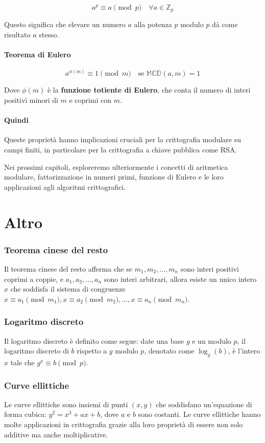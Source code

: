 \documentclass[a4paper,12pt]{report}
\begin{document}
$$a^p \equiv a \pmod{p} \quad \forall a \in \mathbb{Z}_p$$

Questo significa che elevare un numero $a$ alla potenza $p$ modulo $p$ dà come risultato $a$ stesso.

\subsubsection*{Teorema di Eulero}

$$a^{\phi(m)} \equiv 1 \pmod{m} \quad \text{se } \mathbb{MCD}(a,m) = 1$$

Dove $\phi(m)$ è la \textbf{funzione totiente di Eulero}, che conta il numero di interi positivi minori di $m$ e coprimi con $m$.

\subsubsection*{Quindi}
Queste proprietà hanno implicazioni cruciali per la crittografia modulare su campi finiti, in particolare per la crittografia a chiave pubblica come RSA.

Nei prossimi capitoli, esploreremo ulteriormente i concetti di aritmetica modulare, fattorizzazione in numeri primi, funzione di Eulero e le loro applicazioni agli algoritmi crittografici.
%
%
%
\chapter{Altro}
\subsection*{Teorema cinese del resto}
Il teorema cinese del resto afferma che se \( m_1, m_2, \ldots, m_n \) sono interi positivi coprimi a coppie, e \( a_1, a_2, \ldots, a_n \) sono interi arbitrari, allora esiste un unico intero \( x \) che soddisfa il sistema di congruenze \( x \equiv a_1 \pmod{m_1}, x \equiv a_2 \pmod{m_2}, \ldots, x \equiv a_n \pmod{m_n} \).

\subsection*{Logaritmo discreto}
Il logaritmo discreto è definito come segue: date una base \( g \) e un modulo \( p \), il logaritmo discreto di \( b \) rispetto a \( g \) modulo \( p \), denotato come \( \log_g(b) \), è l'intero \( x \) tale che \( g^x \equiv b \pmod{p} \).

\subsection*{Curve ellittiche}
Le curve ellittiche sono insiemi di punti \( (x, y) \) che soddisfano un'equazione di forma cubica: \( y^2 = x^3 + ax + b \), dove \( a \) e \( b \) sono costanti. Le curve ellittiche hanno molte applicazioni in crittografia grazie alla loro proprietà di essere non solo additive ma anche moltiplicative.
\end{document}
